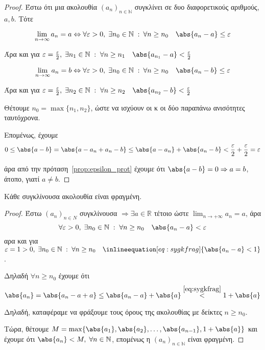 \documentclass[main.tex]{subfiles}
\begin{document}
\begin{proof}
    Έστω ότι μια ακολουθία $ (a_{n})_{n \in \mathbb{N}} $ συγκλίνει σε 
    δυο διαφορετικούς αριθμούς, $ a,b $. Τότε

    \[ 
        \lim_{n \to \infty} a_{n} = a \Leftrightarrow \forall 
        \varepsilon > 0, \; \exists n_{0} \in \mathbb{N} \; : \: 
        \forall n \geq n_{0} \quad \abs{a_{n}- a} \leq \varepsilon 
    \]

    Άρα και για $ \varepsilon = \frac{\varepsilon}{2}, \; \exists n_{1} \in 
    \mathbb{N} \; : \; \forall n \geq n_{1} \quad \abs{a_{n_{1}} - a} 
    < \frac{\varepsilon}{2}  $

    \[ 
        \lim_{n \to \infty} a_{n} = b \Leftrightarrow \forall 
        \varepsilon > 0, \; \exists n_{0} \in \mathbb{N} \; : \: 
        \forall n \geq n_{0} \quad \abs{a_{n}- b} \leq \varepsilon 
    \]

    Άρα και για $ \varepsilon = \frac{\varepsilon}{2}, \; \exists n_{2} \in 
    \mathbb{N} \; : \; \forall n \geq n_{2}  \quad 
    \abs{a_{n_{2}} - b} < \frac{\varepsilon}{2}  $

    Θέτουμε $ n_{0} = \max \{ n_{1}, n_{2} \} $, ώστε να ισχύουν οι 
    κ οι δύο παραπάνω ανισότητες ταυτόχρονα. 

    Επομένως, έχουμε 
    \[
        0 \leq \abs{a-b} = \abs{a- a_{n}+ a_{n}- b} \leq 
        \abs{a- a_{n}} + \abs{a_{n}- b} < \frac{\varepsilon}{2} + 
        \frac{\varepsilon}{2} = \varepsilon 
    \] 

    άρα από την πρόταση~\ref{prop:epsilon_prot} έχουμε ότι 
    $ \abs{a-b} = 0 \Rightarrow a=b $, άτοπο, γιατί $ a \neq b $.
\end{proof}


\begin{thm}
    Κάθε συγκλίνουσα ακολουθία είναι φραγμένη.
\end{thm}

\begin{proof}
    Έστω $ (a_{n})_{n \in \mathbb{Ν}} $ συγκλίνουσα $ \Rightarrow 
    \exists a \in \mathbb{R} $ τέτοιο ώστε $ \lim_{n \to +\infty} a_{n}
    =a $, άρα 
    \[
        \forall \varepsilon > 0, \; \exists n_{0} \in \mathbb{N} \; 
        : \; \forall n \geq n_{0}\quad \abs{a_{n}-a} < \varepsilon  
    \] 
    αρα και για $ \varepsilon =1>0, \; \exists n_{0} \in \mathbb{N} \; 
    : \; \forall n \geq n_{0} \quad 
    \inlineequation[eq:sygkfrag]{\abs{a_{n}-a} < 1} $. 

    Δηλαδή $ \forall n \geq n_{0} $ έχουμε ότι 
    \[
        \abs{a_{n}} = \abs{a_{n}-a + a} \leq \abs{a_{n} - a} + \abs{a} 
        \overset{\eqref{eq:sygkfrag}}{<} 1 + \abs{a}  
    \] 

    Δηλαδή, καταφέραμε να φράξουμε τους όρους της ακολουθίας με δείκτες 
    $n \geq n_{0} $.

    Τώρα, θέτουμε $ M = \max \{ \abs{a_{1}} , \abs{a_{2}} , \ldots, 
    \abs{a_{n-1}} , 1 + \abs{a}\} $ και έχουμε ότι $ \abs{a_{n}} 
    < M, \; \forall n \in \mathbb{N} $, επομένως η 
    $ (a_{n})_{n \in \mathbb{N}} $ είναι φραγμένη.
\end{proof}
\end{document}
